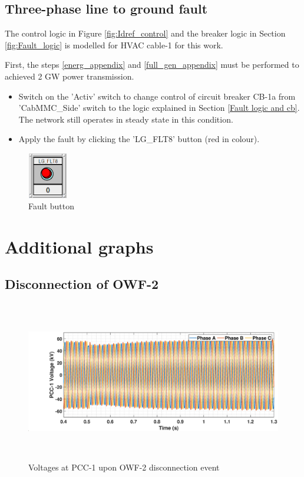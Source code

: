 \subsection{Three-phase line to ground fault}
The control logic in Figure \ref{fig:Idref_control} and the breaker logic in Section \ref{fig:Fault_logic} is modelled for \gls{HVAC} cable-1 for this work. 

First, the steps \ref{energ_appendix} and \ref{full_gen_appendix} must be performed to achieved 2 GW power transmission.

\begin{itemize}
    \item Switch on the 'Activ' switch  to change control of circuit breaker CB-1a from 'CabMMC\_Side' switch to the logic explained in Section \ref{Fault logic and cb}. The network still operates in steady state in this condition.
    \item Apply the fault by clicking the 'LG\_FLT8' button (red in colour).
\end{itemize}

\begin{figure}[H]
\centering
    \includegraphics[height = 2cm,width = 1.75cm]{Diagrams/Appendix_C/Fault_button.PNG}
    \caption{Fault button}
    \label{fig:Fault_button}
\end{figure}

\section{Additional graphs}
\subsection{Disconnection of OWF-2}\label{disconn_owf2_appen}

\begin{figure}[H]
    \includegraphics[height = 7cm,width = \textwidth]{Diagrams/Appendix_C/VABC_WT1_WT2off.eps}
    \caption{Voltages at PCC-1 upon OWF-2 disconnection event}
    \label{VABC_WT1_WT2off}
\end{figure}

